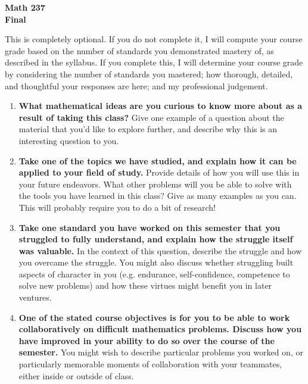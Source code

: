 \documentclass{article}
\begin{document}
\begin{center}
\textbf{Math 237 \\ Final}
\end{center}

This is completely optional. If you do not complete it, I will compute your course grade based on the number of standards you demonstrated mastery of, as described in the syllabus. If you complete this, I will determine your course grade by considering the number of standards you mastered; how thorough, detailed, and thoughtful your responses are here; and my professional judgement.

\begin{enumerate}
\item \textbf{What mathematical ideas are you curious to know more about as a result of taking this class?}  Give one example of a question about the material that you'd like to explore further, and describe why this is an interesting question to you.

\item \textbf{Take one of the topics we have studied, and explain how it can be applied to your field of study.}  Provide details of how you will use this in your future endeavors. What other problems will you be able to solve with the tools you have learned in this class? Give as many examples as you can. This will probably require you to do a bit of research!

\item \textbf{Take one standard you have worked on this semester that you struggled to fully understand, and explain how the struggle itself was valuable.}  In the context of this question, describe the struggle and how you overcame the struggle. You might also discuss whether struggling built aspects of character in you (e.g. endurance, self-confidence, competence to solve new problems) and how these virtues might benefit you in later ventures.

\item \textbf{One of the stated course objectives is for you to be able to work collaboratively on difficult mathematics problems. Discuss how you have improved in your ability to do so over the course of the semester.} You might wish to describe particular problems you worked on, or particularly memorable moments of collaboration with your teammates, either inside or outside of class. 


\end{enumerate}
\end{document}

